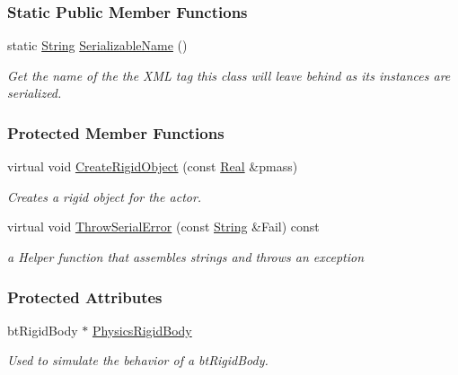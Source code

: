 \subsubsection*{Static Public Member Functions}
\begin{DoxyCompactItemize}
\item 
static \hyperlink{namespaceMezzanine_acf9fcc130e6ebf08e3d8491aebcf1c86}{String} \hyperlink{classMezzanine_1_1ActorRigid_a9f4272bae46df5bd1dfed8753cd19dc6}{SerializableName} ()
\begin{DoxyCompactList}\small\item\em Get the name of the the XML tag this class will leave behind as its instances are serialized. \item\end{DoxyCompactList}\end{DoxyCompactItemize}
\subsubsection*{Protected Member Functions}
\begin{DoxyCompactItemize}
\item 
virtual void \hyperlink{classMezzanine_1_1ActorRigid_a44a1c393e69456fb7fa79affe1684153}{CreateRigidObject} (const \hyperlink{namespaceMezzanine_a726731b1a7df72bf3583e4a97282c6f6}{Real} \&pmass)
\begin{DoxyCompactList}\small\item\em Creates a rigid object for the actor. \item\end{DoxyCompactList}\item 
virtual void \hyperlink{classMezzanine_1_1ActorRigid_ad640944179df98fbaf5ecf5e2ed5ba2c}{ThrowSerialError} (const \hyperlink{namespaceMezzanine_acf9fcc130e6ebf08e3d8491aebcf1c86}{String} \&Fail) const 
\begin{DoxyCompactList}\small\item\em a Helper function that assembles strings and throws an exception \item\end{DoxyCompactList}\end{DoxyCompactItemize}
\subsubsection*{Protected Attributes}
\begin{DoxyCompactItemize}
\item 
\hypertarget{classMezzanine_1_1ActorRigid_a92b4e040b752527b73e861ab7c00119e}{
btRigidBody $\ast$ \hyperlink{classMezzanine_1_1ActorRigid_a92b4e040b752527b73e861ab7c00119e}{PhysicsRigidBody}}
\label{classMezzanine_1_1ActorRigid_a92b4e040b752527b73e861ab7c00119e}

\begin{DoxyCompactList}\small\item\em Used to simulate the behavior of a btRigidBody. \item\end{DoxyCompactList}\end{DoxyCompactItemize}
